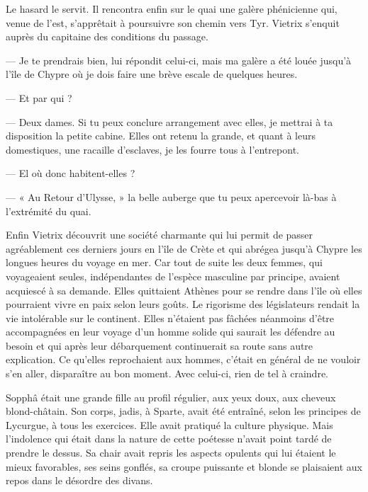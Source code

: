 \documentclass[a4paper, 11pt, oneside, polutonikogreek, french]{article}
\begin{document}
\bigskip
\centerline{\EightStarTaper}
\centerline{\EightStarTaper\EightStarTaper}
\bigskip

Le hasard le servit. Il rencontra enfin sur le quai une galère phénicienne qui, venue de l'est, s'apprêtait à poursuivre son chemin vers Tyr. Vietrix s'enquit auprès du capitaine des conditions du passage.

--- Je te prendrais bien, lui répondit celui-ci, mais ma galère a été louée jusqu'à l'île de Chypre où je dois faire une brève escale de quelques heures.

--- Et par qui ?

--- Deux dames. Si tu peux conclure arrangement avec elles, je mettrai à ta disposition la petite cabine. Elles ont retenu la grande, et quant à leurs domestiques, une racaille d'esclaves, je les fourre tous à l'entrepont.

--- El où donc habitent-elles ?

--- « Au Retour d'Ulysse, » la belle auberge que tu peux apercevoir là-bas à l'extrémité du quai.

Enfin Vietrix découvrit une société charmante qui lui permit de passer agréablement ces derniers jours en l'île de Crète et qui abrégea jusqu'à Chypre les longues heures du voyage en mer. Car tout de suite les deux femmes, qui voyageaient seules, indépendantes de l'espèce masculine par principe, avaient acquiescé à sa demande. Elles quittaient Athènes pour se rendre dans l'île où elles pourraient vivre en paix selon leurs goûts. Le rigorisme des législateurs rendait la vie intolérable sur le continent. Elles n'étaient pas fâchées néanmoins d'être accompagnées en leur voyage d'un homme solide qui saurait les défendre au besoin et qui après leur débarquement continuerait sa route sans autre explication. Ce qu'elles reprochaient aux hommes, c'était en général de ne vouloir s'en aller, disparaître au bon moment. Avec celui-ci, rien de tel à craindre.

\bigskip
\centerline{\EightStarTaper}
\centerline{\EightStarTaper\EightStarTaper}
\bigskip

Sopphâ était une grande fille au profil régulier, aux yeux doux, aux cheveux blond-châtain. Son corps, jadis, à Sparte, avait été entraîné, selon les principes de Lycurgue, à tous les exercices. Elle avait pratiqué la culture physique. Mais l'indolence qui était dans la nature de cette poétesse n'avait point tardé de prendre le dessus. Sa chair avait repris les aspects opulents qui lui étaient le mieux favorables, ses seins gonflés, sa croupe puissante et blonde se plaisaient aux repos dans le désordre des divans.
\end{document}

